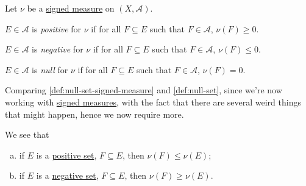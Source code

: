 \begin{definition*}
	Let \(\nu\) be a \hyperref[def:signed-measure]{signed measure} on \((X, \mathcal{A})\).

	\begin{definition}\label{def:positive-set}
		\(E \in \mathcal{A} \) is \emph{positive} for \(\nu\) if for all \(F \subseteq E\) such that \(F \in \mathcal{A} \), \(\nu(F) \geq 0\).
	\end{definition}

	\begin{definition}\label{def:negative-set}
		\(E \in \mathcal{A} \) is \emph{negative} for \(\nu\) if for all \(F \subseteq E\) such that \(F \in \mathcal{A} \), \(\nu(F) \leq 0\).
	\end{definition}

	\begin{definition}\label{def:null-set-signed-measure}
		\(E \in \mathcal{A} \) is \emph{null} for \(\nu\) if for all \(F \subseteq E\) such that \(F \in \mathcal{A} \), \(\nu(F) = 0\).
	\end{definition}
\end{definition*}

\begin{intuition}
	Comparing \autoref{def:null-set-signed-measure} and \autoref{def:null-set}, since we're now working with \hyperref[def:signed-measure]{signed measures}, with the fact that there are several weird things that might happen, hence we now require more.
\end{intuition}

\begin{note}
	We see that
	\begin{enumerate}[(a)]
		\item if \(E\) is a \hyperref[def:positive-set]{positive set}, \(F \subseteq E\), then \(\nu(F) \leq \nu(E)\);
		\item if \(E\) is a \hyperref[def:negative-set]{negative set}, \(F \subseteq E\), then \(\nu(F) \geq \nu(E)\).
	\end{enumerate}
\end{note}

